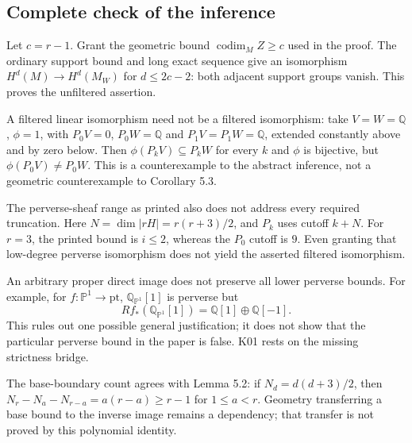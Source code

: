 \documentclass[10pt]{article}
\begin{document}
\subsection*{Complete check of the inference}
Let \(c=r-1\). Grant the geometric bound \(\operatorname{codim}_M Z\geq c\) used in the proof. The ordinary support bound and long exact sequence give an isomorphism \(H^d(M)\to H^d(M_W)\) for \(d\leq2c-2\): both adjacent support groups vanish. This proves the unfiltered assertion.\par
A filtered linear isomorphism need not be a filtered isomorphism: take \(V=W=\mathbb Q\), \(\phi=1\), with \(P_0V=0\), \(P_0W=\mathbb Q\) and \(P_1V=P_1W=\mathbb Q\), extended constantly above and by zero below. Then \(\phi(P_kV)\subseteq P_kW\) for every \(k\) and \(\phi\) is bijective, but \(\phi(P_0V)\ne P_0W\). This is a counterexample to the abstract inference, not a geometric counterexample to Corollary 5.3.\par
The perverse-sheaf range as printed also does not address every required truncation. Here \(N=\dim|rH|=r(r+3)/2\), and \(P_k\) uses cutoff \(k+N\). For \(r=3\), the printed bound is \(i\leq2\), whereas the \(P_0\) cutoff is \(9\). Even granting that low-degree perverse isomorphism does not yield the asserted filtered isomorphism.\par
An arbitrary proper direct image does not preserve all lower perverse bounds. For example, for \(f:\mathbb P^1\to\mathrm{pt}\), \(\mathbb Q_{\mathbb P^1}[1]\) is perverse but \[Rf_*(\mathbb Q_{\mathbb P^1}[1])=\mathbb Q[1]\oplus\mathbb Q[-1].\] This rules out one possible general justification; it does not show that the particular perverse bound in the paper is false. K01 rests on the missing strictness bridge.\par
The base-boundary count agrees with Lemma 5.2: if \(N_d=d(d+3)/2\), then \(N_r-N_a-N_{r-a}=a(r-a)\geq r-1\) for \(1\leq a<r\). Geometry transferring a base bound to the inverse image remains a dependency; that transfer is not proved by this polynomial identity.\par
\end{document}
